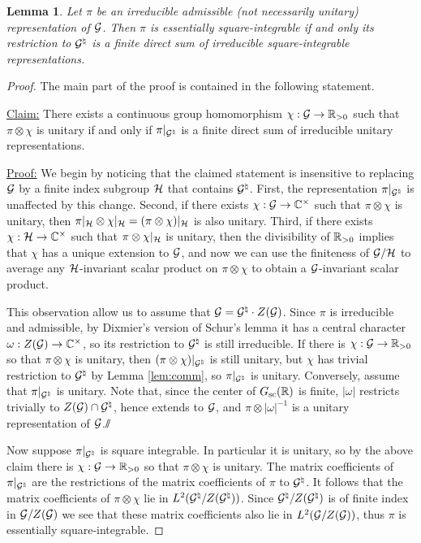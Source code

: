 \documentclass{article}
\newtheorem{lem}[thm]{Lemma}
\theoremstyle{definition}
\numberwithin{equation}{section}
\renewcommand{\-}{\hyp{}}
\begin{document}
\begin{lem} \label{lem:eds-equiv}
  Let $\pi$ be an irreducible admissible (not necessarily unitary) representation of $\mathcal{G}$.
  Then $\pi$ is essentially square-integrable if and only its restriction to $\mathcal{G}^\natural$ is a finite direct sum of irreducible square-integrable representations.
\end{lem}
\begin{proof}
The main part of the proof is contained in the following statement.

\ul{Claim:} There exists a continuous group homomorphism $\chi : \mathcal{G} \to \mathbb{R}_{>0}$ such that $\pi\otimes\chi$ is unitary if and only if $\pi|_{\mathcal{G}^{\natural}}$ is a finite direct sum of irreducible unitary representations.

\ul{Proof:} We begin by noticing that the claimed statement is insensitive to replacing $\mathcal{G}$ by a finite index subgroup $\mathcal{H}$ that contains $\mathcal{G}^\natural$. First, the representation $\pi|_{\mathcal{G}^\natural}$ is unaffected by this change. Second, if there exists $\chi : \mathcal{G} \to \mathbb{C}^\times$ such that $\pi \otimes \chi$ is unitary, then $\pi|_{\mathcal{H}} \otimes \chi|_{\mathcal{H}} = (\pi\otimes\chi)|_{\mathcal{H}}$ is also unitary. Third, if there exists $\chi : \mathcal{H} \to \mathbb{C}^\times$ such that $\pi \otimes \chi|_{\mathcal{H}}$ is unitary, then the divisibility of $\mathbb{R}_{>0}$ implies that $\chi$ has a unique extension to $\mathcal{G}$, and now we can use the finiteness of $\mathcal{G}/\mathcal{H}$ to average any $\mathcal{H}$-invariant scalar product on $\pi\otimes\chi$ to obtain a $\mathcal{G}$-invariant scalar product.

This observation allow us to assume that $\mathcal{G}=\mathcal{G}^\natural \cdot Z(\mathcal{G})$. Since $\pi$ is irreducible and admissible, by Dixmier's version of Schur's lemma
\cite[Lemma 0.5.3]{wallach}
it has a central character
$\omega : Z(\mathcal{G}) \to \mathbb{C}^\times$, so its restriction to $\mathcal{G}^\natural$ is still irreducible. If there is $\chi : \mathcal{G} \to \mathbb{R}_{>0}$ so that $\pi \otimes \chi$ is unitary, then $(\pi\otimes\chi)|_{\mathcal{G}^\natural}$ is still unitary, but $\chi$ has trivial restriction to $\mathcal{G}^\natural$ by Lemma \ref{lem:comm}, so $\pi|_{\mathcal{G}^\natural}$ is unitary. Conversely, assume that $\pi|_{\mathcal{G}^\natural}$ is unitary. Note that, since the center of $G_{\textrm{sc}}(\mathbb{R})$ is finite, $|\omega|$ restricts trivially to $Z(\mathcal{G}) \cap \mathcal{G}^\natural$, hence extends to $\mathcal{G}$, and $\pi\otimes|\omega|^{-1}$ is a unitary representation of $\mathcal{G}$.\hfill $\sslash$

Now suppose $\pi|_{\mathcal{G}^\natural}$ is square integrable. In particular it is unitary, so by the above claim there is $\chi : \mathcal{G} \to \mathbb{R}_{>0}$ so that $\pi\otimes\chi$ is unitary. The matrix coefficients of $\pi|_{\mathcal{G}^\natural}$ are the restrictions of the matrix coefficients of $\pi$ to $\mathcal{G}^\natural$. It follows that the matrix coefficients of $\pi\otimes\chi$ lie in $L^2(\mathcal{G}^\natural/Z(\mathcal{G}^\natural))$. Since $\mathcal{G}^\natural/Z(\mathcal{G}^\natural)$ is of finite index in $\mathcal{G}/Z(\mathcal{G})$ we see that these matrix coefficients also lie in $L^2(\mathcal{G}/Z(\mathcal{G}))$, thus $\pi$ is essentially square-integrable.


\end{proof}
\end{document}
